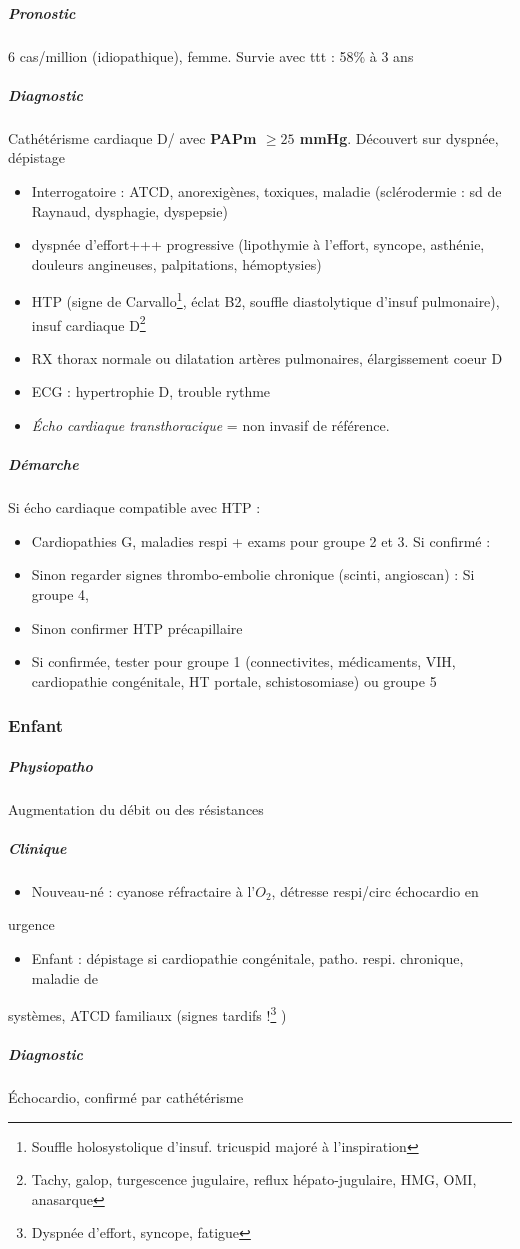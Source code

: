 \documentclass[11pt]{article}
\begin{document}
\subparagraph{Pronostic}
\label{sec:orgbb65de1}
6 cas/million (idiopathique), femme. Survie avec ttt : 58\% à 3 ans

\subparagraph{Diagnostic}
\label{sec:org2ae41a2}
Cathétérisme cardiaque D/ avec \textbf{PAPm \(\ge 25\) mmHg}. Découvert sur dyspnée, dépistage
\begin{itemize}
\item Interrogatoire : ATCD, anorexigènes, toxiques, maladie (sclérodermie : sd de
Raynaud, dysphagie, dyspepsie)
\item dyspnée d'effort+++ progressive (lipothymie à l'effort,
syncope, asthénie, douleurs angineuses, palpitations, hémoptysies)
\item HTP (signe de Carvallo\footnote{Souffle holosystolique d'insuf. tricuspid majoré à l'inspiration}, éclat B2, souffle diastolytique d'insuf pulmonaire), insuf cardiaque D\footnote{Tachy, galop, turgescence jugulaire, reflux hépato-jugulaire, HMG, OMI, anasarque}
\item RX thorax normale ou dilatation artères pulmonaires, élargissement coeur D
\item ECG : hypertrophie D, trouble rythme
\item \emph{Écho cardiaque transthoracique} = non invasif de référence.
\end{itemize}

\subparagraph{Démarche}
\label{sec:orgdf606c1}
Si écho cardiaque compatible avec HTP :

\begin{itemize}
\item Cardiopathies G, maladies respi + exams pour groupe 2 et 3. Si confirmé : \faHandStopO
\item Sinon regarder signes thrombo-embolie chronique (scinti, angioscan) : Si
groupe 4, \faHandStopO
\item Sinon confirmer HTP précapillaire
\item Si confirmée, tester pour groupe 1 (connectivites, médicaments, VIH,
cardiopathie congénitale, HT portale, schistosomiase) ou groupe 5
\end{itemize}

\subsubsection{Enfant}
\label{sec:org6ac8c4a}

\subparagraph{Physiopatho}
\label{sec:orgd56294f}
Augmentation du débit ou des résistances

\subparagraph{Clinique}
\label{sec:org5d6bbaa}
\begin{itemize}
\item Nouveau-né : cyanose réfractaire à l'\(O_2\), détresse respi/circ \thus échocardio en
\end{itemize}
urgence \danger
\begin{itemize}
\item Enfant : dépistage si cardiopathie congénitale, patho. respi. chronique, maladie de
\end{itemize}
systèmes, ATCD familiaux (signes tardifs !\footnote{Dyspnée d'effort, syncope, fatigue} )
\subparagraph{Diagnostic}
\label{sec:org078ac1a}
Échocardio, confirmé par cathétérisme 
\end{document}
